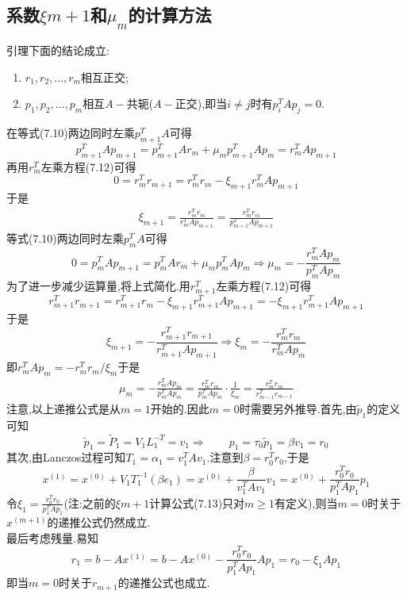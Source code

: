\documentclass[12pt,a4paper]{article}
\begin{document}
\subsection*{\color{blue}系数$\xi m+1$和$\mu_{m}$的计算方法}
{\color{blue}引理}\qquad 下面的结论成立:
\begin{enumerate}[(1)]
\item $r_{1}, r_{2}, \ldots, r_{m}$相互正交;
\item $p_{1}, p_{2}, \dots, p_{m}$相互$A-$共轭($A-$正交),即当$i \neq j$时有$p_{i}^{T} A p_{j}=0$.
\end{enumerate}
在等式(7.10)两边同时左乘$p_{m+1}^{T} A$可得
$$
p_{m+1}^{T} A p_{m+1}=p_{m+1}^{T} A r_{m}+\mu_{m} p_{m+1}^{T} A p_{m}=r_{m}^{T} A p_{m+1}
$$
再用$r_{m}^{T}$左乘方程(7.12)可得
$$
0=r_{m}^{T} r_{m+1}=r_{m}^{T} r_{m}-\xi_{m+1} r_{m}^{T} A p_{m+1}
$$
于是
\begin{align*}
\xi_{m+1}=\frac{r_{m}^{T} r_{m}}{r_{m}^{T} A p_{m+1}}=\frac{r_{m}^{T} r_{m}}{p_{m+1}^{T} A p_{m+1}}
\tag{7.13}
\end{align*}
等式(7.10)两边同时左乘$p_{m}^{T} A$可得
$$
0=p_{m}^{T} A p_{m+1}=p_{m}^{T} A r_{m}+\mu_{m} p_{m}^{T} A p_{m} \Longrightarrow \mu_{m}=-\frac{r_{m}^{T} A p_{m}}{p_{m}^{T} A p_{m}}
$$
为了进一步减少运算量,将上式简化.用$r_{m+1}^{T}$左乘方程(7.12)可得
$$
r_{m+1}^{T} r_{m+1}=r_{m+1}^{T} r_{m}-\xi_{m+1} r_{m+1}^{T} A p_{m+1}=-\xi_{m+1} r_{m+1}^{T} A p_{m+1}
$$
于是
$$
\xi_{m+1}=-\frac{r_{m+1}^{T} r_{m+1}}{r_{m+1}^{T} A p_{m+1}} \Longrightarrow \xi_{m}=-\frac{r_{m}^{T} r_{m}}{r_{m}^{T} A p_{m}}
$$
即$r_{m}^{T} A p_{m}=-r_{m}^{T} r_{m} / \xi_{m}$于是
\begin{align*}
\mu_{m}=-\frac{r_{m}^{T} A p_{m}}{p_{m}^{T} A p_{m}}=\frac{r_{m}^{T} r_{m}}{p_{m}^{T} A p_{m}} \cdot \frac{1}{\xi_{m}}=\frac{r_{m}^{T} r_{m}}{r_{m-1}^{T} r_{m-1}}
\tag{7.14}
\end{align*}
注意,以上递推公式是从$m=1$开始的.因此$m=0$时需要另外推导.首先,由$\tilde{p}_{1}$的定义可知
$$
\tilde{p}_{1}=\tilde{P}_{1}=V_{1} L_{1}^{-T}=v_{1} \Longrightarrow \quad \quad p_{1}=\tau_{0} \tilde{p}_{1}=\beta v_{1}=r_{0}
$$
其次,由Lanczos过程可知$T_{1}=\alpha_{1}=v_{1}^{T} A v_{1}$.注意到$\beta=r_{0}^{T} r_{0}$,于是
$$
x^{(1)}=x^{(0)}+V_{1} T_{1}^{-1}\left(\beta e_{1}\right)=x^{(0)}+\frac{\beta}{v_{1}^{T} A v_{1}} v_{1}=x^{(0)}+\frac{r_{0}^{T} r_{0}}{p_{1}^{T} A p_{1}} p_{1}
$$
令$\xi_{1}=\frac{r_{0}^{T} r_{0}}{p_{1}^{T} A p_{1}}$(注:之前的$\xi m+1$计算公式(7.13)只对$m \geq 1$有定义),则当$m=0$时关于$x^{(m+1)}$的递推公式仍然成立.\\
最后考虑残量.易知
$$
r_{1}=b-A x^{(1)}=b-A x^{(0)}-\frac{r_{0}^{T} r_{0}}{p_{1}^{T} A p_{1}} A p_{1}=r_{0}-\xi_{1} A p_{1}
$$
即当$m=0$时关于$r_{m+1}$的递推公式也成立.\\
\end{document}
